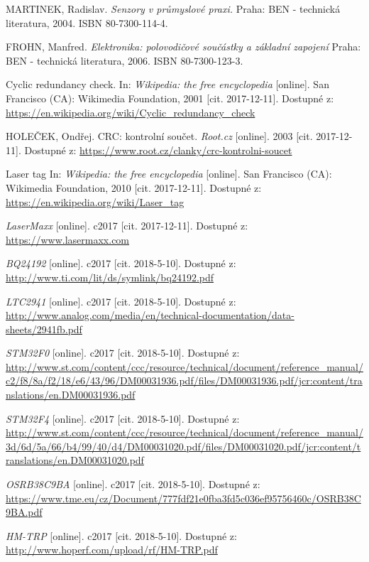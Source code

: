 \begin{literatura}{99}

    MARTINEK, Radislav.
    \emph{Senzory v průmyslové praxi.}
    Praha: BEN - technická literatura, 2004. ISBN 80-7300-114-4.

    FROHN, Manfred.
    \emph{Elektronika: polovodičové součástky a základní zapojení}
    Praha: BEN - technická literatura, 2006. ISBN 80-7300-123-3.

    Cyclic redundancy check.
    In: \emph{Wikipedia: the free encyclopedia} [online].
    San Francisco (CA): Wikimedia Foundation, 2001 [cit. 2017-12-11].
    Dostupné z: \url{https://en.wikipedia.org/wiki/Cyclic_redundancy_check}

    HOLEČEK, Ondřej.
    CRC: kontrolní součet.
    \emph{Root.cz} [online].
    2003 [cit. 2017-12-11].
    Dostupné z: \url{https://www.root.cz/clanky/crc-kontrolni-soucet}

    Laser tag
    In: \emph{Wikipedia: the free encyclopedia} [online].
    San Francisco (CA): Wikimedia Foundation, 2010 [cit. 2017-12-11].
    Dostupné z: \url{https://en.wikipedia.org/wiki/Laser_tag}

    \emph{LaserMaxx} [online].
    c2017 [cit. 2017-12-11].
    Dostupné z: \url{https://www.lasermaxx.com}

    \emph{BQ24192} [online].
    c2017 [cit. 2018-5-10].
    Dostupné z: \url{http://www.ti.com/lit/ds/symlink/bq24192.pdf}

    \emph{LTC2941} [online].
    c2017 [cit. 2018-5-10].
    Dostupné z: \url{http://www.analog.com/media/en/technical-documentation/data-sheets/2941fb.pdf}

    \emph{STM32F0} [online].
    c2017 [cit. 2018-5-10].
    Dostupné z: \url{http://www.st.com/content/ccc/resource/technical/document/reference_manual/c2/f8/8a/f2/18/e6/43/96/DM00031936.pdf/files/DM00031936.pdf/jcr:content/translations/en.DM00031936.pdf}

    \emph{STM32F4} [online].
    c2017 [cit. 2018-5-10].
    Dostupné z: \url{http://www.st.com/content/ccc/resource/technical/document/reference_manual/3d/6d/5a/66/b4/99/40/d4/DM00031020.pdf/files/DM00031020.pdf/jcr:content/translations/en.DM00031020.pdf}

    \emph{OSRB38C9BA} [online].
    c2017 [cit. 2018-5-10].
    Dostupné z: \url{https://www.tme.eu/cz/Document/777fdf21e0fba3fd5c036ef95756460c/OSRB38C9BA.pdf}

    \emph{HM-TRP} [online].
    c2017 [cit. 2018-5-10].
    Dostupné z: \url{http://www.hoperf.com/upload/rf/HM-TRP.pdf}

\end{literatura}
